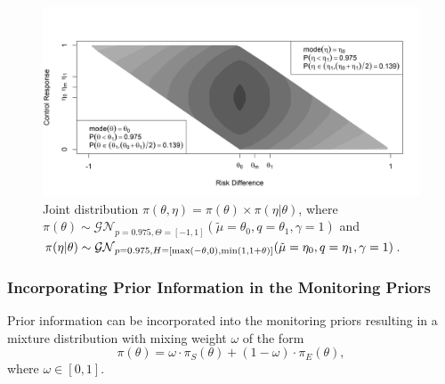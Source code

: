 \documentclass[useAMS,usenatbib,referee]{biom}
\begin{document}

\begin{figure}\begin{center}
\includegraphics[width=6in]{figure5a.png}
\caption{Joint distribution $\pi(\theta,\eta)=\pi(\theta)\times\pi(\eta|\theta)$, where $
\pi(\theta)\sim\mathcal{GN}_{p=0.975,\Theta=[-1,1]}(\tilde{\mu}=\theta_0,q=\theta_1,\gamma=1)$ and $\pi(\eta|\theta)\sim \mathcal{GN}_{p=0.975,H=[{\mathrm{max}}(-\theta,0),{\mathrm{min}}(1,1+\theta)]}(\tilde{\mu}=\eta_0,q=\eta_1,\gamma=1)$.}
\label{fig:figure5}
 \end{center}
\end{figure}



\subsubsection{Incorporating Prior Information in the Monitoring Priors}\label{sec:incorporating}
Prior information can be incorporated into the monitoring priors resulting in a mixture distribution with mixing weight $\omega$ of the form
\begin{equation}\label{eq:inference_prior}
\pi\left(\theta\right)=\omega\cdot\pi_{S}\left(\theta\right)+(1-\omega) \cdot \pi_E\left(\theta\right),
\end{equation}
where $\omega\in[0,1]$. 
\end{document}
